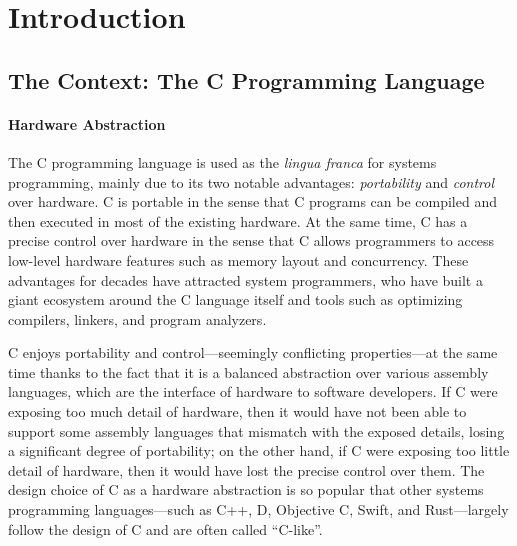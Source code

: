 \section{Introduction}
\label{sec:introduction}

\subsection{The Context: The C Programming Language}
\label{sec:introduction:context}

\paragraph{Hardware Abstraction}

The C programming language is used as the \emph{lingua franca} for systems programming, mainly due
to its two notable advantages: \emph{portability} and \emph{control} over hardware.  C is portable
in the sense that C programs can be compiled and then executed in most of the existing hardware.  At
the same time, C has a precise control over hardware in the sense that C allows programmers to
access low-level hardware features such as memory layout and concurrency.  These advantages for
decades have attracted system programmers, who have built a giant ecosystem around the C language
itself and tools such as optimizing compilers, linkers, and program analyzers.

C enjoys portability and control---seemingly conflicting properties---at the same time thanks to the
fact that it is a balanced abstraction over various assembly languages, which are the interface of
hardware to software developers.  If C were exposing too much detail of hardware, then it would have
not been able to support some assembly languages that mismatch with the exposed details, losing a
significant degree of portability; on the other hand, if C were exposing too little detail of
hardware, then it would have lost the precise control over them.  The design choice of C as a
hardware abstraction is so popular that other systems programming languages---such as C++, D,
Objective C, Swift, and Rust---largely follow the design of C and are often called ``C-like''.




